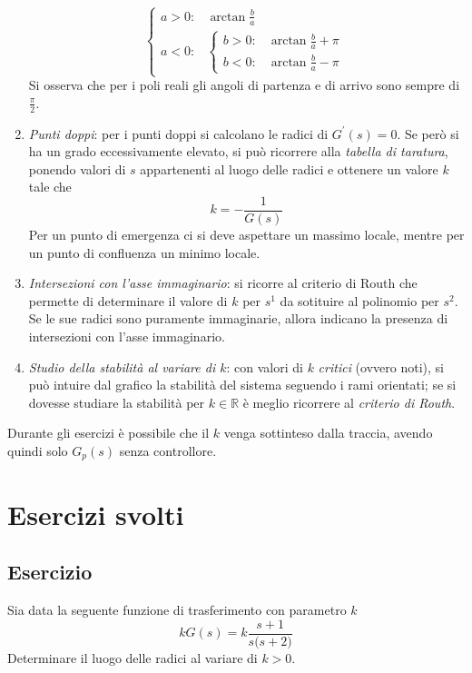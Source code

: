 \begin{enumerate}
\[\begin{cases}
				a > 0 \colon & \arctan{\frac{b}{a}} \\
				a < 0 \colon &
					\begin{cases}
						b > 0\colon & \arctan{\frac{b}{a}} +\pi \\
						b < 0\colon & \arctan{\frac{b}{a}} -\pi
					\end{cases}
			\end{cases}
		\]
		Si osserva che per i poli reali gli angoli di partenza e di arrivo
		sono sempre di \(\frac{\pi}{2}\).
	\item \emph{Punti doppi}:
		per i punti doppi si calcolano le radici di \(G^\prime(s) = 0\).
		Se però si ha un grado eccessivamente elevato, si può ricorrere
		alla \emph{tabella di taratura}, ponendo valori di \(s\) appartenenti
		al luogo delle radici e ottenere un valore \(k\) tale che
		\[
			k = -\frac{1}{G(s)}
		\]
		Per un punto di emergenza ci si deve aspettare un massimo locale,
		mentre per un punto di confluenza un minimo locale.
	\item \emph{Intersezioni con l'asse immaginario}: si ricorre al criterio
		di Routh che permette di determinare il valore di \(k\) per
		\(s^1\) da sotituire al polinomio per \(s^2\). Se le sue
		radici sono puramente immaginarie, allora indicano la presenza di
		intersezioni con l'asse immaginario.
	\item \emph{Studio della stabilità al variare di \(k\)}: con valori
		di \(k\) \emph{critici} (ovvero noti), si può intuire
		dal grafico la stabilità del sistema seguendo i rami orientati;
		se si dovesse studiare la stabilità per \(k \in \mathbb{R}\) è
		meglio ricorrere al \emph{criterio di Routh}.
\end{enumerate}

\begin{nota}
Durante gli esercizi è possibile che il \(k\) venga sottinteso dalla traccia,
avendo quindi solo \(G_p(s)\) senza controllore.
\end{nota}

\section{Esercizi svolti}
\subsection{Esercizio}
Sia data la seguente funzione di trasferimento con parametro \(k\)
\[
	kG(s) = k \frac{s+1}{s \bigl( s+2 \bigr)}
\]
Determinare il luogo delle radici al variare di \(k > 0\).

